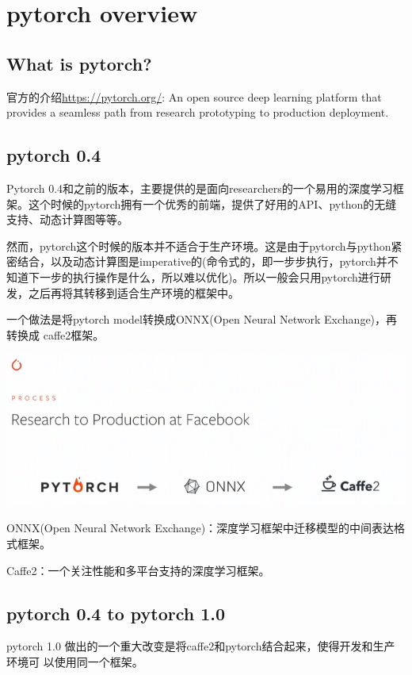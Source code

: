 \section{pytorch overview}

\subsection{What is pytorch?}


官方的介绍\url{https://pytorch.org/}: An open source deep learning platform that provides a seamless path from research prototyping to production deployment.

\subsection{pytorch 0.4}

Pytorch 0.4和之前的版本，主要提供的是面向researchers的一个易用的深度学习框架。这个时候的pytorch拥有一个优秀的前端，提供了好用的API、python的无缝支持、动态计算图等等。

然而，pytorch这个时候的版本并不适合于生产环境。这是由于pytorch与python紧密结合，以及动态计算图是imperative的(命令式的，即一步步执行，pytorch并不知道下一步的执行操作是什么，所以难以优化)。所以一般会只用pytorch进行研发，之后再将其转移到适合生产环境的框架中。

一个做法是将pytorch model转换成ONNX(Open Neural Network Exchange)，再转换成
caffe2框架。

\includegraphics[width=0.8\linewidth]{pytorch/pic/pytorch_to_caffe2.png}

ONNX(Open Neural Network Exchange)：深度学习框架中迁移模型的中间表达格式框架。

Caffe2：一个关注性能和多平台支持的深度学习框架。

\subsection{pytorch 0.4 to pytorch 1.0}

pytorch 1.0 做出的一个重大改变是将caffe2和pytorch结合起来，使得开发和生产环境可
以使用同一个框架。

